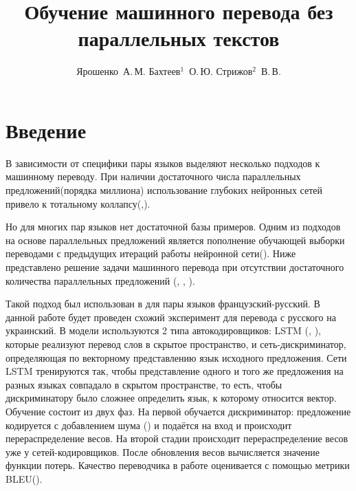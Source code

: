\documentclass[12pt,twoside]{article}
\title
    [Обучение машинного перевода без параллельных текстов] %
    {Обучение машинного перевода без параллельных текстов}
\author
    [Ярошенко~А.\,М. Бахтеев$^1$~О.\,Ю.  Стрижов$^2$~В.\,В.] %
{Ярошенко~А.\,М. Бахтеев$^1$~О.\,Ю.  Стрижов$^2$~В.\,В.} %
[Ярошенко~А.\,М. Бахтеев$^1$~О.\,Ю.  Стрижов$^2$~В.\,В.] %
\begin{document}
\maketitle

\section{Введение}

В зависимости от специфики пары языков выделяют несколько подходов к машинному переводу. При наличии достаточного числа параллельных предложений(порядка миллиона) использование глубоких нейронных сетей привело к тотальному коллапсу(\cite{zou2013bilingual},\cite{cho2014properties}). 

Но для многих пар языков нет достаточной базы примеров. Одним из подходов на основе параллельных предложений является пополнение обучающей выборки переводами с предыдущих итераций работы нейронной сети(\cite{bertoldi2009domain}). Ниже представлено решение задачи машинного перевода при отсутствии достаточного количества параллельных предложений (\cite{wu2016google}, \cite{sutskever2014sequence}, \cite{bahdanau2014neural}). 
 

Такой подход был использован в \cite{lample2017unsupervised} для пары языков французский-русский. В данной работе будет проведен схожий эксперимент для перевода с русского на украинский. В модели используются 2 типа автокодировщиков: LSTM (\cite{gers1999learning}, \cite{graves2005framewise}), которые реализуют перевод слов в скрытое пространство, и сеть-дискриминатор, определяющая по векторному представлению язык исходного предложения. Сети LSTM тренируются так, чтобы представление одного и того же предложения на разных языках совпадало в скрытом пространстве, то есть, чтобы дискриминатору было сложнее определить язык, к которому относится вектор. Обучение состоит из двух фаз. На первой обучается дискриминатор: предложение кодируется с добавлением шума (\cite{kimimproving}) и подаётся на вход и происходит перераспределение весов. На второй стадии происходит перераспределение весов уже у сетей-кодировщиков. После обновления весов  вычисляется значение функции потерь. Качество переводчика в работе оценивается с помощью метрики BLEU(\cite{papineni2002bleu}).






\end{document}
